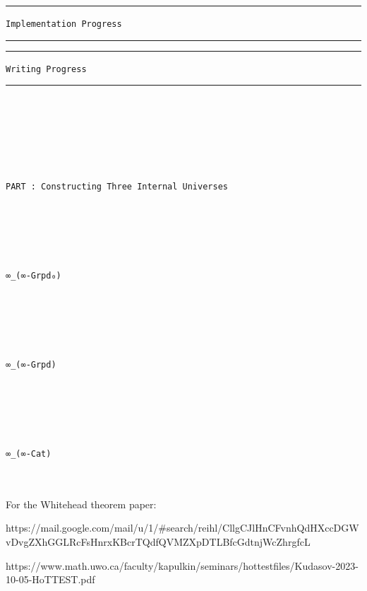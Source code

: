 \documentclass{book}
\theoremstyle{definition}
\newcounter{pcounter}
\renewcommand{\chapter}[1]{
\newpage
{
\Huge 
\begin{center}
\ \\
\ \\
\thispagestyle{empty}
\texttt{#1}
\end{center}}
\ \\
\ \\
}
\newcounter{partcount}
\renewcommand{\part}[1]{
\newpage
{
\Huge 
\begin{center}
\ \\
\ \\
\ \\
\ \\
\ \\
\ \\
\thispagestyle{empty}
\texttt{PART {\thepartcount}: #1}
\stepcounter{partcount}
\end{center}}
\ \\
\ \\
}
\begin{document}
\noindent\textcolor{Red}{\rule{16cm}{1mm}}
\begin{center}
\texttt{Implementation Progress}
\end{center}
\noindent\textcolor{Red}{\rule{16cm}{1mm}}

\noindent\textcolor{Red}{\rule{16cm}{1mm}}
\begin{center}
\texttt{Writing Progress}
\end{center}
\noindent\textcolor{Red}{\rule{16cm}{1mm}}

\part{Constructing Three Internal Universes}


\chapter{∞\_(∞-Grpd₀)}




\chapter{∞\_(∞-Grpd)}




\chapter{∞\_(∞-Cat)}

\iffalse
For the Whitehead theorem paper:

https://mail.google.com/mail/u/1/#search/reihl/CllgCJlHnCFvnhQdHXccDGWvDvgZXhGGLRcFsHnrxKBcrTQdfQVMZXpDTLBfcGdtnjWcZhrgfcL

https://www.math.uwo.ca/faculty/kapulkin/seminars/hottestfiles/Kudasov-2023-10-05-HoTTEST.pdf
\end{document}
